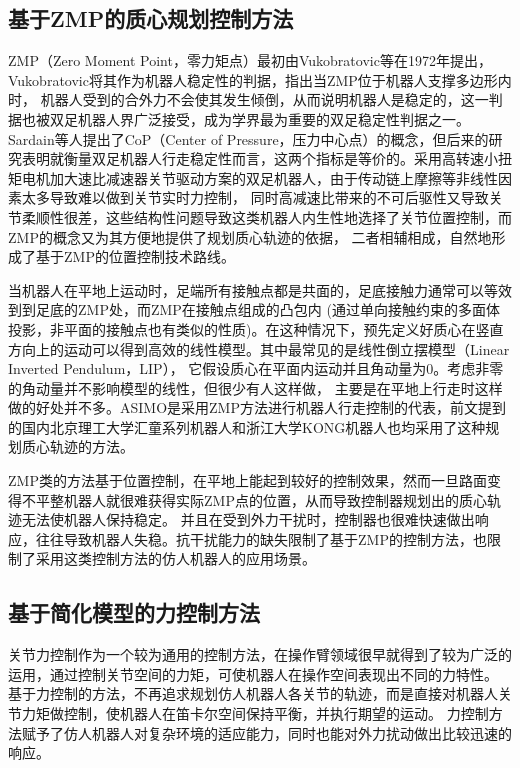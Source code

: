 \subsection{基于ZMP的质心规划控制方法}
ZMP（Zero Moment Point，零力矩点）最初由Vukobratovic等在1972年提出\cite{vukobratovic2004zero}，Vukobratovic将其作为机器人稳定性的判据，指出当ZMP位于机器人支撑多边形内时，
机器人受到的合外力不会使其发生倾倒，从而说明机器人是稳定的，这一判据也被双足机器人界广泛接受，成为学界最为重要的双足稳定性判据之一。
Sardain等人提出了CoP（Center of Pressure，压力中心点）的概念，但后来的研究表明就衡量双足机器人行走稳定性而言，这两个指标是等价的。采用高转速小扭矩电机加大速比减速器关节驱动方案的双足机器人，由于传动链上摩擦等非线性因素太多导致难以做到关节实时力控制，
同时高减速比带来的不可后驱性又导致关节柔顺性很差，这些结构性问题导致这类机器人内生性地选择了关节位置控制，而ZMP的概念又为其方便地提供了规划质心轨迹的依据，
二者相辅相成，自然地形成了基于ZMP的位置控制技术路线。

当机器人在平地上运动时，足端所有接触点都是共面的，足底接触力通常可以等效到到足底的ZMP处，而ZMP在接触点组成的凸包内\cite{wieber2002stability}
(通过单向接触约束的多面体投影，非平面的接触点也有类似的性质\cite{caron2016zmp})。在这种情况下，预先定义好质心在竖直方向上的运动可以得到高效的线性模型。其中最常见的是线性倒立摆模型（Linear Inverted Pendulum，LIP），
它假设质心在平面内运动并且角动量为0\cite{kajita1991study}。考虑非零的角动量并不影响模型的线性，但很少有人这样做，
主要是在平地上行走时这样做的好处并不多\cite{koolen2012capturability}。ASIMO是采用ZMP方法进行机器人行走控制的代表，前文提到的国内北京理工大学汇童系列机器人和浙江大学KONG机器人也均采用了这种规划质心轨迹的方法。

ZMP类的方法基于位置控制，在平地上能起到较好的控制效果，然而一旦路面变得不平整机器人就很难获得实际ZMP点的位置，从而导致控制器规划出的质心轨迹无法使机器人保持稳定。
并且在受到外力干扰时，控制器也很难快速做出响应，往往导致机器人失稳。抗干扰能力的缺失限制了基于ZMP的控制方法，也限制了采用这类控制方法的仿人机器人的应用场景。

\subsection{基于简化模型的力控制方法}
关节力控制作为一个较为通用的控制方法，在操作臂领域很早就得到了较为广泛的运用，通过控制关节空间的力矩，可使机器人在操作空间表现出不同的力特性。
基于力控制的方法，不再追求规划仿人机器人各关节的轨迹，而是直接对机器人关节力矩做控制，使机器人在笛卡尔空间保持平衡，并执行期望的运动。
力控制方法赋予了仿人机器人对复杂环境的适应能力，同时也能对外力扰动做出比较迅速的响应。

